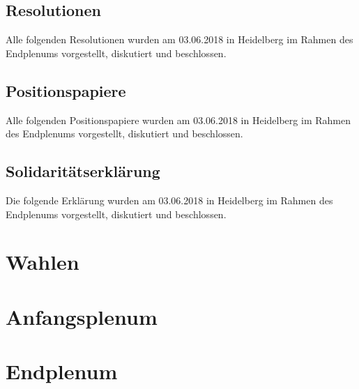 \documentclass[ngerman, twoside, 10pt, openany, a5paper]{scrbook}
\begin{document}
  \section{Resolutionen}
    Alle folgenden Resolutionen wurden am 03.06.2018 in Heidelberg im Rahmen des Endplenums
    vorgestellt, diskutiert und beschlossen.
      
      
      
      
      
      
      
      
      

  \newpage
  \section{Positionspapiere}
    Alle folgenden Positionspapiere wurden am 03.06.2018 in Heidelberg im Rahmen des Endplenums
    vorgestellt, diskutiert und beschlossen.
      
      
      

  \newpage
  \section{Solidaritätserklärung}
    Die folgende Erklärung wurden am 03.06.2018 in Heidelberg im Rahmen des Endplenums
    vorgestellt, diskutiert und beschlossen.
      

\chapter{Wahlen}
  

\chapter{Anfangsplenum}
  
\chapter{Endplenum}
  
\end{document}
